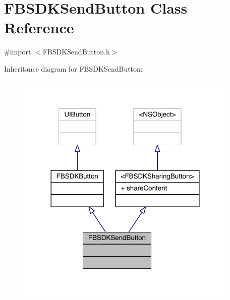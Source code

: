 \hypertarget{interface_f_b_s_d_k_send_button}{\section{F\-B\-S\-D\-K\-Send\-Button Class Reference}
\label{interface_f_b_s_d_k_send_button}
}


{\ttfamily \#import $<$F\-B\-S\-D\-K\-Send\-Button.\-h$>$}



Inheritance diagram for F\-B\-S\-D\-K\-Send\-Button\-:
\nopagebreak
\begin{figure}[H]
\begin{center}
\leavevmode
\includegraphics[width=300pt]{interface_f_b_s_d_k_send_button__inherit__graph}
\end{center}
\end{figure}


